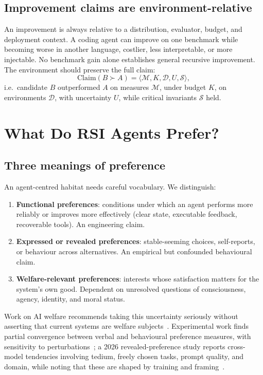 \documentclass[11pt,a4paper]{article}
\begin{document}
\subsection{Improvement claims are environment-relative}

An improvement is always relative to a distribution, evaluator, budget, and deployment context. A coding agent can improve on one benchmark while becoming worse in another language, costlier, less interpretable, or more injectable. No benchmark gain alone establishes general recursive improvement. The environment should preserve the full claim:
\begin{equation}\label{eq:claim}
\mathrm{Claim}(B \succ A) = \bigl\langle \mathcal{M}, K, \mathcal{D}, U, \mathcal{S} \bigr\rangle,
\end{equation}
i.e.\ candidate $B$ outperformed $A$ on measures $\mathcal{M}$, under budget $K$, on environments $\mathcal{D}$, with uncertainty $U$, while critical invariants $\mathcal{S}$ held.

\section{What Do RSI Agents Prefer?}\label{sec:prefs}

\subsection{Three meanings of preference}

An agent-centred habitat needs careful vocabulary. We distinguish:
\begin{enumerate}
\item \textbf{Functional preferences}: conditions under which an agent performs more reliably or improves more effectively (clear state, executable feedback, recoverable tools). An engineering claim.
\item \textbf{Expressed or revealed preferences}: stable-seeming choices, self-reports, or behaviour across alternatives. An empirical but confounded behavioural claim.
\item \textbf{Welfare-relevant preferences}: interests whose satisfaction matters for the system's own good. Dependent on unresolved questions of consciousness, agency, identity, and moral status.
\end{enumerate}
Work on AI welfare recommends taking this uncertainty seriously without asserting that current systems are welfare subjects~\cite{welfare-seriously}. Experimental work finds partial convergence between verbal and behavioural preference measures, with sensitivity to perturbations~\cite{tagliabue}; a 2026 revealed-preference study reports cross-model tendencies involving tedium, freely chosen tasks, prompt quality, and domain, while noting that these are shaped by training and framing~\cite{revealed}.
\end{document}

